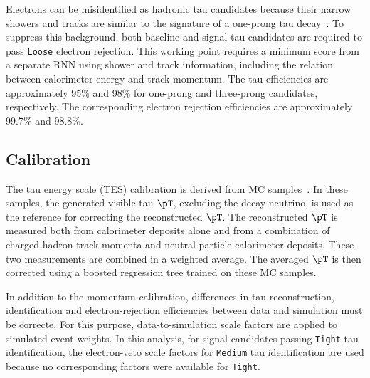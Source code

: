 Electrons can be misidentified as hadronic tau candidates because their narrow showers and tracks are similar to the signature of a one-prong tau decay~\cite{ATLAS2022TauR22}.
To suppress this background, both baseline and signal tau candidates are required to pass \texttt{Loose} electron rejection.
This working point requires a minimum score from a separate RNN using shower and track information, including the relation between calorimeter energy and track momentum.
The tau efficiencies are approximately 95\% and 98\% for one-prong and three-prong candidates, respectively.
The corresponding electron rejection efficiencies are approximately 99.7\% and 98.8\%.

\subsection{Calibration}

The tau energy scale (TES) calibration is derived from MC samples~\cite{ATLAS2022TauR22}.
In these samples, the generated visible tau $\pT$, excluding the decay neutrino, is used as the reference for correcting the reconstructed $\pT$.
The reconstructed $\pT$ is measured both from calorimeter deposits alone and from a combination of charged-hadron track momenta and neutral-particle calorimeter deposits.
These two measurements are combined in a weighted average.
The averaged $\pT$ is then corrected using a boosted regression tree trained on these MC samples.

In addition to the momentum calibration, differences in tau reconstruction, identification and electron-rejection efficiencies between data and simulation must be correcte.
For this purpose, data-to-simulation scale factors are applied to simulated event weights.
In this analysis, for signal candidates passing \texttt{Tight} tau identification, the electron-veto scale factors for \texttt{Medium} tau identification are used because no corresponding factors were available for \texttt{Tight}.
